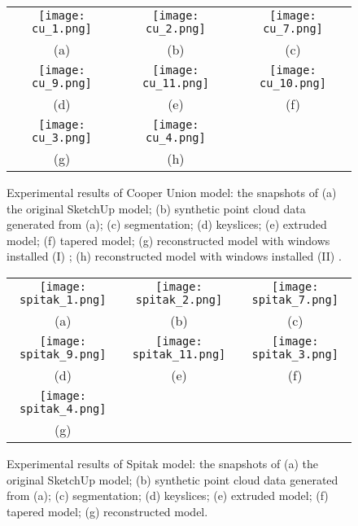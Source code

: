 
\begin{figure} [htbp]
\begin{center}
\begin{tabular}{ccc}
\texttt{[image: cu\_1.png]} &
\texttt{[image: cu\_2.png]} &
\texttt{[image: cu\_7.png]} \\
(a) & (b) & (c)\\
\texttt{[image: cu\_9.png]} &
\texttt{[image: cu\_11.png]} &
\texttt{[image: cu\_10.png]} \\
(d) & (e) & (f)\\
\texttt{[image: cu\_3.png]} &
\texttt{[image: cu\_4.png]} \\
(g) & (h)
\end{tabular}
\end{center}
\caption{ Experimental results of Cooper Union model: the snapshots of
      (a) the original SketchUp model;
      (b) synthetic point cloud data generated from (a);
      (c) segmentation;
      (d) keyslices;
      (e) extruded model;
      (f) tapered model;
      (g) reconstructed model with windows installed (I) ;
      (h) reconstructed model with windows installed (II) .
}
\label{fig:ER_Fig1}
\end{figure}

\begin{figure} [htbp]
\begin{center}
\begin{tabular}{ccc}
\texttt{[image: spitak\_1.png]} &
\texttt{[image: spitak\_2.png]} &
\texttt{[image: spitak\_7.png]} \\
(a) & (b) & (c) \\
\texttt{[image: spitak\_9.png]} &
\texttt{[image: spitak\_11.png]} &
\texttt{[image: spitak\_3.png]} \\
(d) & (e) & (f) \\
\texttt{[image: spitak\_4.png]} \\
(g)
\end{tabular}
\end{center}
\caption{ Experimental results of Spitak model: the snapshots of
      (a) the original SketchUp model;
      (b) synthetic point cloud data generated from (a);
      (c) segmentation;
      (d) keyslices;
      (e) extruded model;
      (f) tapered model;
      (g) reconstructed model.
}
\label{fig:ER_Fig2}
\end{figure}

